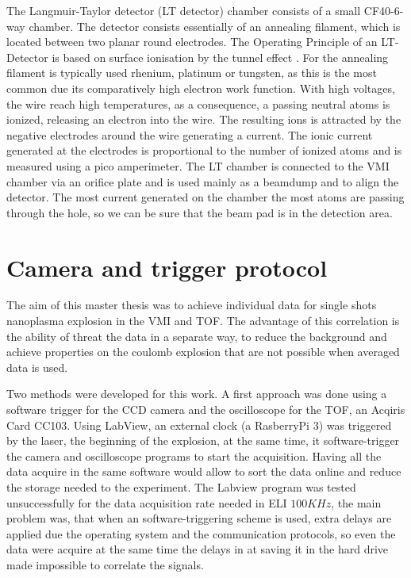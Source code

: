 The Langmuir-Taylor detector (LT detector)  chamber consists of a small CF40-6-way chamber. The detector consists essentially of an annealing filament, which is located between two planar round electrodes. The Operating Principle of an LT-Detector 
is based on surface ionisation by the tunnel effect \cite{delhuille_optimization_2002}. For the annealing filament is typically used  rhenium, platinum or tungsten, as this is the most common due its comparatively high electron work function. With high voltages, the wire reach high temperatures, as a consequence, a passing neutral atoms is ionized, releasing an electron into the wire. The resulting ions is attracted by the negative electrodes around the wire generating a current. The ionic current generated at the electrodes is proportional to the number of ionized atoms and is measured using a pico amperimeter.
The LT chamber is connected to the VMI chamber via an orifice plate and is used mainly as a beamdump and to align the detector. The most current generated on the chamber the most atoms are passing through the  hole, so we can be sure that the beam pad is in the detection area.

\section{Camera and trigger protocol}

The aim of this master thesis was to achieve individual data for single shots nanoplasma explosion in the VMI and TOF. The advantage of this correlation is the ability of threat the data in a separate way, to reduce the background and achieve  properties on the coulomb explosion that are not possible when averaged data is used.

Two methods were developed for this work. A first approach was done using a software trigger for the CCD camera and the oscilloscope for the TOF, an Acqiris Card CC103. Using LabView, an external clock (a RasberryPi 3) was triggered by the laser, the beginning of the explosion,  at the same time, it software-trigger the camera and oscilloscope programs to start the acquisition. Having all the data acquire in the same software would allow to sort the data online and reduce the storage needed to the experiment. The Labview program was tested unsuccessfully for the data acquisition rate needed in ELI $100KHz$, the main problem was, that when an software-triggering scheme is used,  extra delays are applied due the operating system and the communication protocols, so even the data were acquire at the same time the delays in at saving  it in the hard drive made impossible to correlate the signals.

